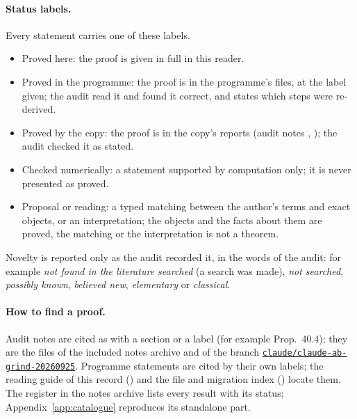 \paragraph{Status labels.}
Every statement carries one of these labels.
\begin{itemize}
\item \textsf{Proved here}: the proof is given in full in this reader.
\item \textsf{Proved in the programme}: the proof is in the programme's files, at the label given; the audit read it and found it correct, and states which steps were re-derived.
\item \textsf{Proved by the copy}: the proof is in the copy's reports (audit notes , ); the audit checked it as stated.
\item \textsf{Checked numerically}: a statement supported by computation only; it is never presented as proved.
\item \textsf{Proposal} or \textsf{reading}: a typed matching between the author's terms and exact objects, or an interpretation; the objects and the facts about them are proved, the matching or the interpretation is not a theorem.
\end{itemize}
Novelty is reported only as the audit recorded it, in the words of the audit: for example \emph{not found in the literature searched} (a search was made), \emph{not searched}, \emph{possibly known}, \emph{believed new}, \emph{elementary} or \emph{classical}.

\paragraph{How to find a proof.}
Audit notes are cited as  with a section or a label (for example  Prop.~40.4); they are the files of the included notes archive and of the branch \href{https://github.com/KokunoYumeto/zeta-function-research-reader/tree/claude/claude-ab-grind-20260925/contrib/claude-ab/grind_20260925}{\texttt{claude/claude-ab-grind-20260925}}.
Programme statements are cited by their own labels; the reading guide of this record () and the file and migration index () locate them.
The register  in the notes archive lists every result with its status; Appendix~\ref{app:catalogue} reproduces its standalone part.
